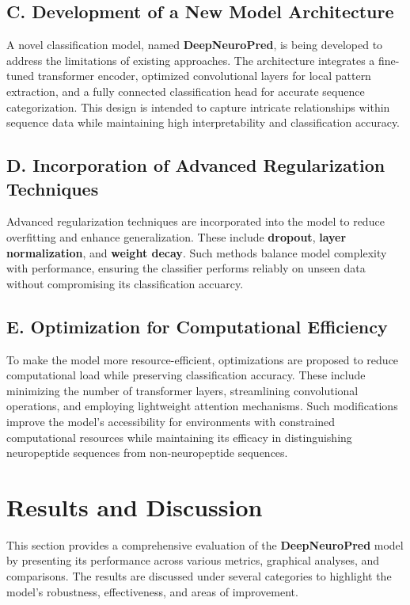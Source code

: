 \documentclass[conference]{IEEEtran}
\begin{document}
\subsection*{C. Development of a New Model Architecture}
A novel classification model, named \textbf{DeepNeuroPred}, is being developed to address the limitations of existing approaches. The architecture integrates a fine-tuned transformer encoder, optimized convolutional layers for local pattern extraction, and a fully connected classification head for accurate sequence categorization. This design is intended to capture intricate relationships within sequence data while maintaining high interpretability and classification accuracy.

\subsection*{D. Incorporation of Advanced Regularization Techniques}
Advanced regularization techniques are incorporated into the model to reduce overfitting and enhance generalization. These include \textbf{dropout}, \textbf{layer normalization}, and \textbf{weight decay}. Such methods balance model complexity with performance, ensuring the classifier performs reliably on unseen data without compromising its classification accuarcy.

\subsection*{E. Optimization for Computational Efficiency}
To make the model more resource-efficient, optimizations are proposed to reduce computational load while preserving classification accuracy. These include minimizing the number of transformer layers, streamlining convolutional operations, and employing lightweight attention mechanisms. Such modifications improve the model’s accessibility for environments with constrained computational resources while maintaining its efficacy in distinguishing neuropeptide sequences from non-neuropeptide sequences.

\section{Results and Discussion}

This section provides a comprehensive evaluation of the \textbf{DeepNeuroPred} model by presenting its performance across various metrics, graphical analyses, and comparisons. The results are discussed under several categories to highlight the model's robustness, effectiveness, and areas of improvement.
\end{document}
